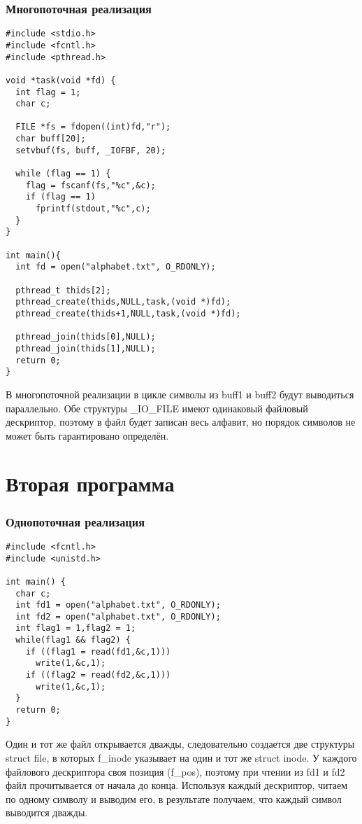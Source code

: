 \subsubsection{Многопоточная реализация}
\begin{lstlisting}
#include <stdio.h>
#include <fcntl.h>
#include <pthread.h>

void *task(void *fd) {
  int flag = 1;
  char c;

  FILE *fs = fdopen((int)fd,"r");
  char buff[20];
  setvbuf(fs, buff, _IOFBF, 20);

  while (flag == 1) {
    flag = fscanf(fs,"%c",&c);
    if (flag == 1)
      fprintf(stdout,"%c",c);
  }
}

int main(){
  int fd = open("alphabet.txt", O_RDONLY);

  pthread_t thids[2];
  pthread_create(thids,NULL,task,(void *)fd);
  pthread_create(thids+1,NULL,task,(void *)fd);

  pthread_join(thids[0],NULL);
  pthread_join(thids[1],NULL);
  return 0;
}
\end{lstlisting}

В многопоточной реализации в цикле символы из
buff1 и buff2 будут выводиться параллельно. Обе структуры \_IO\_FILE
имеют одинаковый файловый дескриптор, поэтому в файл будет записан весь алфавит,
но порядок символов не может быть гарантировано определён.

\section{Вторая программа}


\subsubsection{Однопоточная реализация}
\begin{lstlisting}
#include <fcntl.h>
#include <unistd.h>

int main() {
  char c;
  int fd1 = open("alphabet.txt", O_RDONLY);
  int fd2 = open("alphabet.txt", O_RDONLY);
  int flag1 = 1,flag2 = 1;
  while(flag1 && flag2) {
    if ((flag1 = read(fd1,&c,1)))
      write(1,&c,1);
    if ((flag2 = read(fd2,&c,1)))
      write(1,&c,1);
  }
  return 0;
}
\end{lstlisting}

Один и тот же файл открывается дважды, следовательно создается
две структуры struct file, в которых f\_inode указывает на один и тот же
struct inode. У каждого файлового дескриптора своя позиция (f\_pos), поэтому
при чтении из fd1 и fd2 файл прочитывается от начала до конца. Используя
каждый дескриптор, читаем по одному символу и выводим его, в результате
получаем, что каждый символ выводится дважды.

